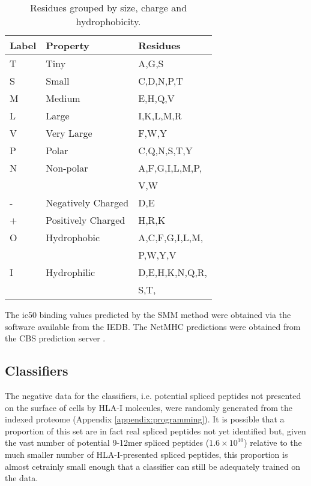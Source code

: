 \documentclass[10pt,a4paper,twoside,twocolumn]{article}
\begin{document}
\begin{table}[]
	\centering
	\begin{tabular}{lll}
		\textbf{Label} & \textbf{Property}       & \textbf{Residues   }           \\ \hline
		T     & Tiny               & A,G,S                 \\
		S     & Small              & C,D,N,P,T             \\
		M     & Medium             & E,H,Q,V               \\
		L     & Large              & I,K,L,M,R             \\
		V     & Very Large         & F,W,Y                 \\
		P     & Polar              & C,Q,N,S,T,Y           \\
		N     & Non-polar          & A,F,G,I,L,M,P,\\
		&&V,W     \\
		-     & Negatively Charged & D,E                   \\
		+     & Positively Charged & H,R,K                 \\
		O     & Hydrophobic        & A,C,F,G,I,L,M, \\
		&&P,W,Y,V\\
		I     & Hydrophilic        & D,E,H,K,N,Q,R, \\
		&& S,T,   
	\end{tabular}
	\caption{Residues grouped by size, charge and hydrophobicity.}
	\label{residue-properties}
\end{table}

The ic50 binding values predicted by the SMM method \cite{Peters2005} were obtained via the software available from the IEDB. The NetMHC predictions were obtained from the CBS prediction server \cite{Andreatta2016}.

\subsection*{Classifiers}

The negative data for the classifiers, i.e. potential spliced peptides not presented on the surface of cells by HLA-I molecules, were randomly generated from the indexed proteome (Appendix \ref{appendix:programming}). It is possible that a proportion of this set are in fact real spliced peptides not yet identified but, given the vast number of potential 9-12mer spliced peptides ($1.6\times10^{10}$) relative to the much smaller number of HLA-I-presented spliced peptides, this proportion is almost cetrainly small enough that a classifier can still be adequately trained on the data.
\end{document}
